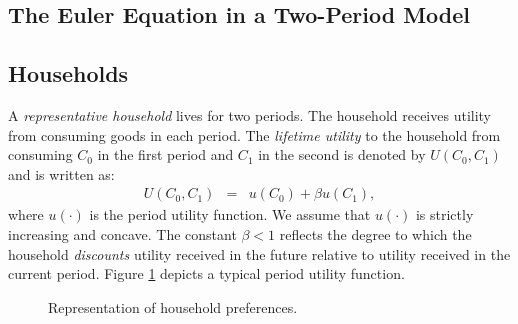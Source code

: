 \documentclass[12pt,fleqn]{article}
\newcommand{\EE}{\begin{eqnarray}}
\newcommand{\FF}{\end{eqnarray}}
\begin{document}
\cleardoublepage
\begin{appendix}

\section{The Euler Equation in a Two-Period Model}

\subsection{Households}

A \emph{representative household} lives for two periods. The household receives utility from consuming goods in each period. The \emph{lifetime utility} to the household from consuming $C_0$ in the first period and $C_1$ in the second is denoted by $U(C_0,C_1)$ and is written as:
	\EE
	U(C_0,C_1) & = & u(C_0) + \beta u(C_1),  \label{eqn:two_per_utility}
	\FF
where $u(\cdot)$ is the period utility function. We assume that $u(\cdot)$ is strictly increasing and concave. The constant $\beta<1$ reflects the degree to which the household \emph{discounts} utility received in the future relative to utility received in the current period. Figure \ref{fig:two_per_util} depicts a typical period utility function.

	\begin{figure}[h] \caption{\label{fig:two_per_util} Representation of household preferences.}
	\begin{center}


\end{center}
\end{figure}
\end{appendix}
\end{document}
